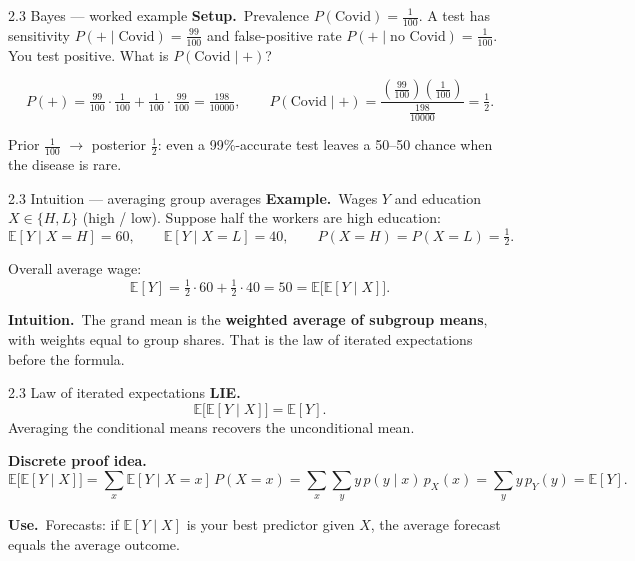 \documentclass[11pt,aspectratio=169]{beamer}
\begin{document}
\begin{frame}{2.3 Bayes --- worked example}
  \footnotesize
  \textbf{Setup.}\ Prevalence $P(\text{Covid})=\tfrac{1}{100}$.
  A test has sensitivity $P(+\mid \text{Covid})=\tfrac{99}{100}$
  and false-positive rate $P(+\mid \text{no Covid})=\tfrac{1}{100}$.
  You test positive. What is $P(\text{Covid}\mid +)$?

  \medskip
  \[
    P(+)
    =\tfrac{99}{100}\cdot\tfrac{1}{100}+\tfrac{1}{100}\cdot\tfrac{99}{100}
    =\tfrac{198}{10000},
    \qquad
    P(\text{Covid}\mid +)
    =\frac{(\tfrac{99}{100})(\tfrac{1}{100})}{\tfrac{198}{10000}}
    =\tfrac12.
  \]

  \medskip
  Prior $\tfrac{1}{100}$ $\to$ posterior $\tfrac12$:
  even a 99\%-accurate test leaves a 50--50 chance when the disease is rare.
\end{frame}

\begin{frame}{2.3 Intuition --- averaging group averages}
  \footnotesize
  \textbf{Example.}\ Wages $Y$ and education $X\in\{H,L\}$ (high / low).
  Suppose half the workers are high education:
  \[
    \mathbb{E}[Y\mid X=H]=60,
    \qquad
    \mathbb{E}[Y\mid X=L]=40,
    \qquad
    P(X=H)=P(X=L)=\tfrac12.
  \]

  \medskip
  Overall average wage:
  \[
    \mathbb{E}[Y]
    =\tfrac12\cdot 60+\tfrac12\cdot 40
    =50
    =\mathbb{E}\bigl[\mathbb{E}[Y\mid X]\bigr].
  \]

  \medskip
  \textbf{Intuition.}\
  The grand mean is the \textbf{weighted average of subgroup means},
  with weights equal to group shares.
  That is the law of iterated expectations before the formula.
\end{frame}

\begin{frame}{2.3 Law of iterated expectations}
  \footnotesize
  \textbf{LIE.}\
  \[
    \mathbb{E}\bigl[\mathbb{E}[Y\mid X]\bigr]=\mathbb{E}[Y].
  \]
  Averaging the conditional means recovers the unconditional mean.

  \medskip
  \textbf{Discrete proof idea.}\
  \[
    \mathbb{E}\bigl[\mathbb{E}[Y\mid X]\bigr]
    =\sum_x \mathbb{E}[Y\mid X=x]\,P(X=x)
    =\sum_x\sum_y y\,p(y\mid x)\,p_X(x)
    =\sum_y y\,p_Y(y)
    =\mathbb{E}[Y].
  \]

  \medskip
  \textbf{Use.}\
  Forecasts: if $\mathbb{E}[Y\mid X]$ is your best predictor given $X$,
  the average forecast equals the average outcome.
\end{frame}
\end{document}
